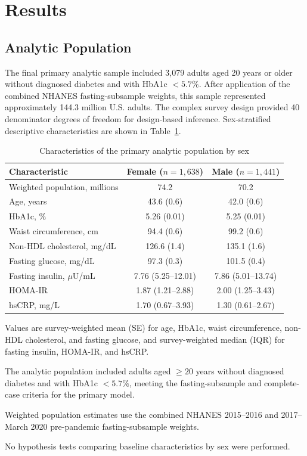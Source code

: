 \documentclass[11pt]{article}
\begin{document}

\section{Results}

\subsection{Analytic Population}

The final primary analytic sample included 3,079 adults aged 20 years or older
without diagnosed diabetes and with HbA1c $<5.7\%$. After application of the
combined NHANES fasting-subsample weights, this sample represented
approximately 144.3 million U.S. adults. The complex survey design provided
40 denominator degrees of freedom for design-based inference. Sex-stratified descriptive characteristics are shown in Table~\ref{tab:table1}.


\begin{table}[htbp]
\centering
\caption{Characteristics of the primary analytic population by sex}
\label{tab:table1}
\begin{threeparttable}
\begin{tabular}{lcc}
\toprule
Characteristic & Female ($n=1,638$) & Male ($n=1,441$) \\
\midrule
Weighted population, millions & 74.2 & 70.2 \\
Age, years & 43.6 (0.6) & 42.0 (0.6) \\
HbA1c, \% & 5.26 (0.01) & 5.25 (0.01) \\
Waist circumference, cm & 94.4 (0.6) & 99.2 (0.6) \\
Non-HDL cholesterol, mg/dL & 126.6 (1.4) & 135.1 (1.6) \\
Fasting glucose, mg/dL & 97.3 (0.3) & 101.5 (0.4) \\
Fasting insulin, $\mu$U/mL & 7.76 (5.25--12.01) & 7.86 (5.01--13.74) \\
HOMA-IR & 1.87 (1.21--2.88) & 2.00 (1.25--3.43) \\
hsCRP, mg/L & 1.70 (0.67--3.93) & 1.30 (0.61--2.67) \\
\bottomrule
\end{tabular}
\begin{tablenotes}[flushleft]
\footnotesize
\item Values are survey-weighted mean (SE) for age, HbA1c, waist circumference,
non-HDL cholesterol, and fasting glucose, and survey-weighted median (IQR) for
fasting insulin, HOMA-IR, and hsCRP.
\item The analytic population included adults aged $\geq20$ years without
diagnosed diabetes and with HbA1c $<5.7\%$, meeting the fasting-subsample and
complete-case criteria for the primary model.
\item Weighted population estimates use the combined NHANES 2015--2016 and
2017--March 2020 pre-pandemic fasting-subsample weights.
\item No hypothesis tests comparing baseline characteristics by sex were performed.
\end{tablenotes}
\end{threeparttable}
\end{table}
\end{document}
